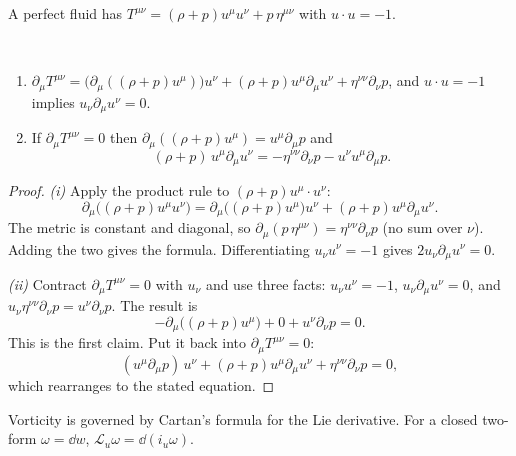 A perfect fluid has $T^{\mu\nu}=(\rho+p)u^\mu u^\nu+p\,\eta^{\mu\nu}$ with $u\cdot u=-1$.

\begin{theorem}\label{thm:euler}\ver\
\begin{enumerate}[label=(\roman*)]
\item $\partial_\mu T^{\mu\nu}=\bigl(\partial_\mu((\rho+p)u^\mu)\bigr)u^\nu+(\rho+p)u^\mu\partial_\mu u^\nu+\eta^{\nu\nu}\partial_\nu p$, and $u\cdot u=-1$ implies $u_\nu\partial_\mu u^\nu=0$.
\item If $\partial_\mu T^{\mu\nu}=0$ then $\partial_\mu((\rho+p)u^\mu)=u^\mu\partial_\mu p$ and
\[
(\rho+p)\,u^\mu\partial_\mu u^\nu=-\eta^{\nu\nu}\partial_\nu p-u^\nu u^\mu\partial_\mu p .
\]
\end{enumerate}
\end{theorem}
\begin{proof}
\emph{(i)} Apply the product rule to $(\rho+p)u^\mu\cdot u^\nu$:
\[
\partial_\mu\bigl((\rho+p)u^\mu u^\nu\bigr)=\partial_\mu\bigl((\rho+p)u^\mu\bigr)u^\nu+(\rho+p)u^\mu\partial_\mu u^\nu .
\]
The metric is constant and diagonal, so $\partial_\mu(p\,\eta^{\mu\nu})=\eta^{\nu\nu}\partial_\nu p$ (no sum over $\nu$). Adding the two gives the formula. Differentiating $u_\nu u^\nu=-1$ gives $2u_\nu\partial_\mu u^\nu=0$.

\emph{(ii)} Contract $\partial_\mu T^{\mu\nu}=0$ with $u_\nu$ and use three facts: $u_\nu u^\nu=-1$, $u_\nu\partial_\mu u^\nu=0$, and $u_\nu\eta^{\nu\nu}\partial_\nu p=u^\nu\partial_\nu p$. The result is
\[
-\partial_\mu\bigl((\rho+p)u^\mu\bigr)+0+u^\nu\partial_\nu p=0 .
\]
This is the first claim. Put it back into $\partial_\mu T^{\mu\nu}=0$:
\[
(u^\mu\partial_\mu p)\,u^\nu+(\rho+p)u^\mu\partial_\mu u^\nu+\eta^{\nu\nu}\partial_\nu p=0 ,
\]
which rearranges to the stated equation.
\end{proof}


Vorticity is governed by Cartan's formula for the Lie derivative. For a closed two-form $\omega=\dd w$, $\mathcal L_u\omega=\dd(i_u\omega)$.

